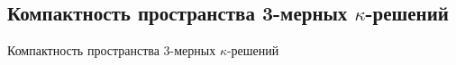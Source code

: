 \subsection{\texorpdfstring{Компактность пространства 3-мерных $\kappa$-решений}{Компактность пространства 3-мерных κ-решений}}
Компактность пространства 3-мерных $\kappa$-решений